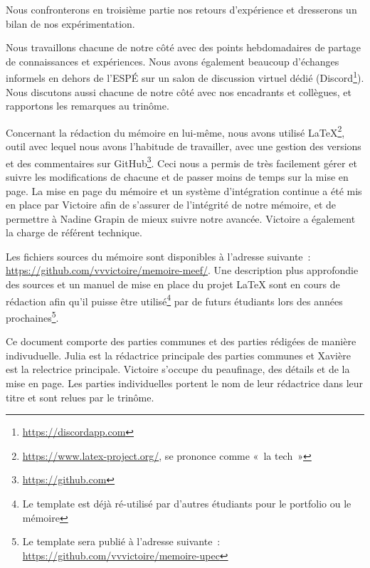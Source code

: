 Nous confronterons en troisième partie nos retours d'expérience et dresserons un bilan de nos expérimentation.

Nous travaillons chacune de notre côté avec des points hebdomadaires de partage de connaissances et expériences. Nous avons également beaucoup d’échanges informels en dehors de l’ESPÉ sur un salon de discussion virtuel dédié (Discord\footnote{\url{https://discordapp.com}}). Nous discutons aussi chacune de notre côté avec nos encadrants et collègues, et rapportons les remarques au trinôme.

Concernant la rédaction du mémoire en lui-même, nous avons utilisé \LaTeX\footnote{\url{https://www.latex-project.org/}, se prononce comme « la tech »},
outil avec lequel nous avons l’habitude de travailler, avec une gestion des versions et des commentaires sur GitHub\footnote{\url{https://github.com}}. Ceci nous a permis de très facilement gérer et suivre les modifications de chacune et de passer moins de temps sur la mise en page. La mise en page du mémoire et un système d'intégration continue a été mis en place par Victoire afin de s'assurer de l'intégrité de notre mémoire, et de permettre à Nadine Grapin de mieux suivre notre avancée. Victoire a également la charge de référent technique.

Les fichiers sources du mémoire sont disponibles à l'adresse suivante : \url{https://github.com/vvvictoire/memoire-meef/}. Une description plus approfondie des sources et un manuel de mise en place du projet \LaTeX{} sont en cours de rédaction afin qu'il puisse être utilisé\footnote{Le template est déjà ré-utilisé par d'autres étudiants pour le portfolio ou le mémoire} par de futurs étudiants lors des années prochaines\footnote{Le template sera publié à l'adresse
suivante : \url{https://github.com/vvvictoire/memoire-upec}}.

Ce document comporte des parties communes et des parties rédigées de manière indivuduelle. Julia est la rédactrice principale des parties communes et Xavière est la relectrice principale.
Victoire s'occupe du peaufinage, des détails et de la mise en page. Les parties individuelles portent le nom de leur rédactrice dans leur titre et sont relues par le trinôme.
